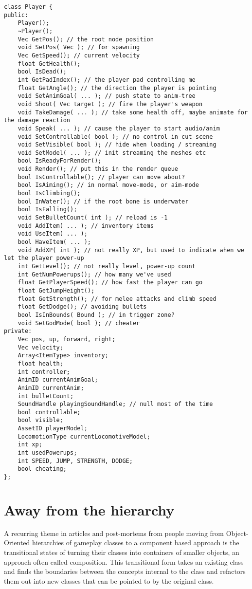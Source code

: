 \begin{lstlisting}[caption=Player class]
class Player {
public:
	Player();
	~Player();
	Vec GetPos(); // the root node position
	void SetPos( Vec ); // for spawning
	Vec GetSpeed(); // current velocity
	float GetHealth();
	bool IsDead();
	int GetPadIndex(); // the player pad controlling me
	float GetAngle(); // the direction the player is pointing 
	void SetAnimGoal( ... ); // push state to anim-tree
	void Shoot( Vec target ); // fire the player's weapon
	void TakeDamage( ... ); // take some health off, maybe animate for the damage reaction
	void Speak( ... ); // cause the player to start audio/anim
	void SetControllable( bool ); // no control in cut-scene
	void SetVisible( bool ); // hide when loading / streaming
	void SetModel( ... ); // init streaming the meshes etc
	bool IsReadyForRender();
	void Render(); // put this in the render queue
	bool IsControllable(); // player can move about?
	bool IsAiming(); // in normal move-mode, or aim-mode
	bool IsClimbing();
	bool InWater(); // if the root bone is underwater
	bool IsFalling();
	void SetBulletCount( int ); // reload is -1
	void AddItem( ... ); // inventory items
	void UseItem( ... );
	bool HaveItem( ... );
	void AddXP( int ); // not really XP, but used to indicate when we let the player power-up
	int GetLevel(); // not really level, power-up count
	int GetNumPowerups(); // how many we've used
	float GetPlayerSpeed(); // how fast the player can go
	float GetJumpHeight();
	float GetStrength(); // for melee attacks and climb speed
	float GetDodge(); // avoiding bullets
	bool IsInBounds( Bound ); // in trigger zone?
	void SetGodMode( bool ); // cheater
private:
	Vec pos, up, forward, right;
	Vec velocity;
	Array<ItemType> inventory;
	float health;
	int controller;
	AnimID currentAnimGoal;
	AnimID currentAnim;
	int bulletCount;
	SoundHandle playingSoundHandle; // null most of the time
	bool controllable;
	bool visible;
	AssetID playerModel;
	LocomotionType currentLocomotiveModel;
	int xp;
	int usedPowerups;
	int SPEED, JUMP, STRENGTH, DODGE;
	bool cheating;
};
\end{lstlisting}

\section{Away from the hierarchy}

A recurring theme in articles and post-mortems from people moving from
Object-Oriented hierarchies of gameplay classes to a component based approach
is the transitional states of turning their classes into containers of smaller
objects, an approach often called composition. This transitional form takes an
existing class and finds the boundaries between the concepts internal to the
class and refactors them out into new classes that can be pointed to by the
original class.

